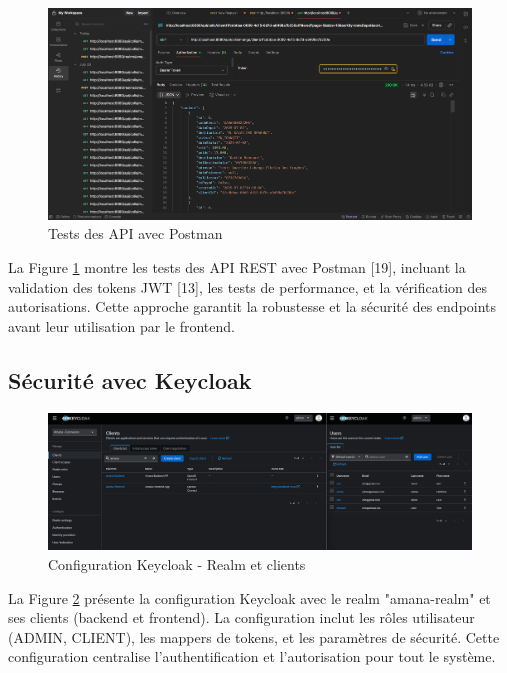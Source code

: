 \begin{figure}[H]
\centering
\includegraphics[width=1.0\textwidth]{images/postman_tests.png}
\caption{Tests des API avec Postman}
\label{fig:postman_tests}
\end{figure}

La Figure \ref{fig:postman_tests} montre les tests des API REST avec Postman [19], incluant la validation des tokens JWT [13], les tests de performance, et la vérification des autorisations. Cette approche garantit la robustesse et la sécurité des endpoints avant leur utilisation par le frontend.

\subsection{Sécurité avec Keycloak}

\begin{figure}[H]
\centering
\includegraphics[width=1.0\textwidth]{images/keycloak_config.png}
\caption{Configuration Keycloak - Realm et clients}
\label{fig:keycloak_config}
\end{figure}

La Figure \ref{fig:keycloak_config} présente la configuration Keycloak avec le realm "amana-realm" et ses clients (backend et frontend). La configuration inclut les rôles utilisateur (ADMIN, CLIENT), les mappers de tokens, et les paramètres de sécurité. Cette configuration centralise l'authentification et l'autorisation pour tout le système.

